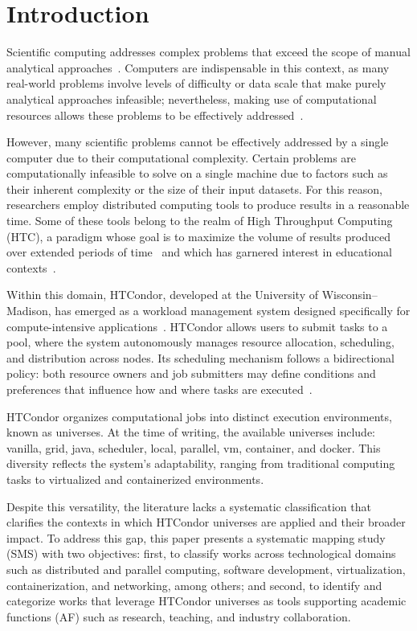 \section{Introduction}
\label{sec:introduccion}
Scientific computing addresses complex problems that exceed the scope of manual analytical approaches~\cite{landau01}. Computers are indispensable in this context, as many real-world problems involve levels of difficulty or data scale that make purely analytical approaches infeasible; nevertheless, making use of computational resources allows these problems to be effectively addressed~\cite{landau01}.

However, many scientific problems cannot be effectively addressed by a single computer due to their computational complexity. Certain problems are computationally infeasible to solve on a single machine due to factors such as their inherent complexity or the size of their input datasets. For this reason, researchers employ distributed computing tools to produce results in a reasonable time. Some of these tools belong to the realm of High Throughput Computing (HTC), a paradigm whose goal is to maximize the volume of results produced over extended periods of time~\cite{juve-01} and which has garnered interest in educational contexts~\cite{Senol-01}.

Within this domain, HTCondor, developed at the University of Wisconsin–Madison, has emerged as a workload management system designed specifically for compute-intensive applications~\cite{chang-01, htcondor-description}. HTCondor allows users to submit tasks to a pool, where the system autonomously manages resource allocation, scheduling, and distribution across nodes. Its scheduling mechanism follows a bidirectional policy: both resource owners and job submitters may define conditions and preferences that influence how and where tasks are executed~\cite{htcondor-description}.

HTCondor organizes computational jobs into distinct execution environments, known as universes. At the time of writing, the available universes include: vanilla, grid, java, scheduler, local, parallel, vm, container, and docker. This diversity reflects the system’s adaptability, ranging from traditional computing tasks to virtualized and containerized environments.

Despite this versatility, the literature lacks a systematic classification that clarifies the contexts in which HTCondor universes are applied and their broader impact. To address this gap, this paper presents a systematic mapping study (SMS) with two objectives: first, to classify works across technological domains such as distributed and parallel computing, software development, virtualization, containerization, and networking, among others; and second, to identify and categorize works that leverage HTCondor universes as tools supporting academic functions (AF) such as research, teaching, and industry collaboration.

